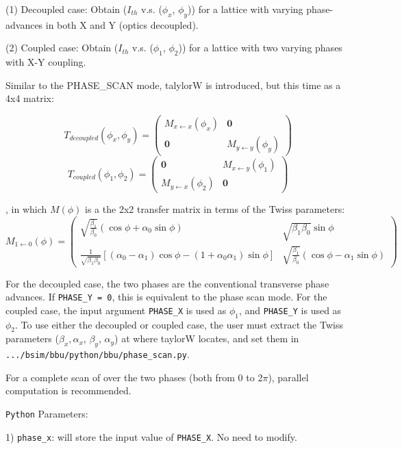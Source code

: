 \documentclass{hitec}
\begin{document}
\bigbreak
(1) Decoupled case: Obtain ($I_{th}$ v.s. ($\phi_x$, $\phi_y$)) for a lattice with varying phase-advances in both X and Y (optics decoupled).

(2) Coupled case: Obtain ($I_{th}$ v.s. ($\phi_1$, $\phi_2$)) for a lattice with two varying phases with X-Y coupling.

\bigbreak
Similar to the PHASE_SCAN mode, talylorW is introduced, but this time as a 4x4 matrix:

  

\[
T_{decoupled}(\phi_{x},\phi_{y}) =
\begin{pmatrix}
   M_{x\leftarrow x} (\phi_{x}) & \boldsymbol{0}    \\
  \boldsymbol{0}  &  M_{y\leftarrow y} (\phi_{y}) 
\end{pmatrix}
\]
\[
T_{coupled}(\phi_{1},\phi_{2}) =
\begin{pmatrix}
  \boldsymbol{0}   & M_{x\leftarrow y} (\phi_{1})   \\
   M_{y\leftarrow x} (\phi_{2})   & \boldsymbol{0}
\end{pmatrix}
\]

, in which $M(\phi)$ is a the 2x2 transfer matrix in terms of the Twiss parameters:
\[
M_{1 \leftarrow 0}(\phi) =
\begin{pmatrix}
  \sqrt{\frac{\beta_{1}}{\beta_{0}}} (\cos\phi+\alpha_{0}\sin\phi) & \sqrt{\beta_{1} \beta_{0}}\sin\phi \\ 
  \frac{1}{\sqrt{\beta_{1}\beta_{0}}}[(\alpha_{0}-\alpha_{1})\cos\phi-(1+\alpha_{0}\alpha_{1})\sin\phi] & \sqrt{\frac{\beta_{1}}{\beta_{0}}} (\cos\phi-\alpha_{1}\sin\phi) 
\end{pmatrix}
\]

For the decoupled case, the two phases are the conventional transverse phase advances. If \texttt{PHASE_Y = 0}, this is equivalent to the phase scan mode. For the coupled case, the input argument \texttt{PHASE_X} is used as $\phi_1$, and \texttt{PHASE_Y} is used as $\phi_2$.
To use either the decoupled or coupled case, the user must extract the Twiss parameters ($\beta_x, \alpha_x$, $\beta_y$, $\alpha_y$) at where taylorW locates, and set them in \texttt{.../bsim/bbu/python/bbu/phase_scan.py}.

For a complete scan of over the two phases (both from 0 to 2$\pi$), parallel computation is recommended. 

\bigbreak
\texttt{Python} Parameters:

1) \texttt{phase_x}: will store the input value of \texttt{PHASE_X}. No need to modify.
\end{document}
